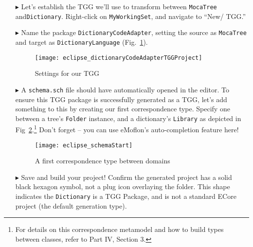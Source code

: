 \begin{enumerate}

\item[$\blacktriangleright$] Let's establish the TGG we'll use to transform between  \texttt{MocaTree} and\texttt{Dictionary}. Right-click on
\texttt{MyWorkingSet}, and navigate to ``New/ TGG.''

\item[$\blacktriangleright$] Name the package \texttt{DictionaryCodeAdapter}, setting the source as \texttt{MocaTree} and
target as \texttt{DictionaryLanguage} (Fig.~\ref{eclipse:newTGGProject}).

\begin{figure}[htbp]
\begin{center}
  \texttt{[image: eclipse\_dictionaryCodeAdapterTGGProject]}
  \caption{Settings for our TGG}
  \label{eclipse:newTGGProject}
\end{center}
\end{figure}

\item[$\blacktriangleright$] A \texttt{schema.sch} file should have automatically opened in the editor. To ensure this TGG package is successfully generated as
a TGG, let's add something to this by creating our first correspondence type. Specify one between a tree's \texttt{Folder} instance, and a dictionary's
\texttt{Library} as depicted in Fig~\ref{eclipse:firstSchema}.\footnote{For details on this correspondence metamodel and how to build types
between classes, refer to Part IV, Section 3.} Don't forget -- you can use eMoflon's auto-completion feature here!

\begin{figure}[htbp]
\begin{center}
  \texttt{[image: eclipse\_schemaStart]}
  \caption{A first correspondence type between domains}
  \label{eclipse:firstSchema}
\end{center}
\end{figure}

\item[$\blacktriangleright$] Save and build your project! Confirm the generated project has a solid black hexagon symbol, not a plug icon
overlaying the folder. This shape indicates the \texttt{Dictionary} is a TGG Package, and is not a standard ECore project (the default generation type).

\end{enumerate}
